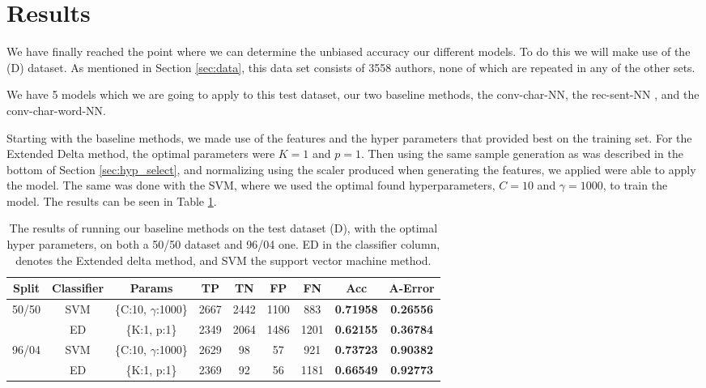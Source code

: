 \section{Results} \label{sec:results}

We have finally reached the point where we can determine the unbiased accuracy
our different models. To do this we will make use of the (D) dataset. As
mentioned in Section \ref{sec:data}, this data set consists of 3558 authors,
none of which are repeated in any of the other sets.

We have 5 models which we are going to apply to this test dataset, our
two baseline methods, the \gls{conv-char-NN}, the \gls{rec-sent-NN} , and the
\gls{conv-char-word-NN}.

Starting with the baseline methods, we made use of the features and the
hyper parameters that provided best on the training set. For the Extended
Delta method, the optimal parameters were $K=1$ and $p = 1$. Then using
the same sample generation as was described in the bottom of Section
\ref{sec:hyp_select}, and normalizing using the scaler produced when
generating the features, we applied were able to apply the model. The same
was done with the SVM, where we used the optimal found hyperparameters, $C=10$
and $\gamma = 1000$, to train the model. The results can be seen in Table
\ref{tab:baseline-res}.

\begin{table}[h]
\centering
\begin{tabular}{|c|c|c|c|c|c|c||c|c|}
\hline
Split & Classifier & Params & TP & TN & FP & FN & \textbf{Acc} & \textbf{A-Error} \\ \hline
\multirow{2}{*}{50/50} & SVM & \{C:10, $\gamma$:1000\} & 2667 & 2442 & 1100 & 883 & \textbf{0.71958} & \textbf{0.26556} \\ \cline{2-9} 
 & ED & \{K:1, p:1\} & 2349 & 2064 & 1486 & 1201 & \textbf{0.62155} & \textbf{0.36784} \\ \hline
\multirow{2}{*}{96/04} & SVM & \{C:10, $\gamma$:1000\} & 2629 & 98 & 57 & 921 & \textbf{0.73723} & \textbf{0.90382} \\ \cline{2-9} 
 & ED & \{K:1, p:1\} & 2369 & 92 & 56 & 1181 & \textbf{0.66549} & \textbf{0.92773} \\ \hline \end{tabular}
\caption{The results of running our baseline methods on the test dataset (D),
with the optimal hyper parameters, on both a 50/50 dataset and 96/04 one. ED in
the classifier column, denotes the Extended delta method, and SVM the support
vector machine method.}
\label{tab:baseline-res}
\end{table}


